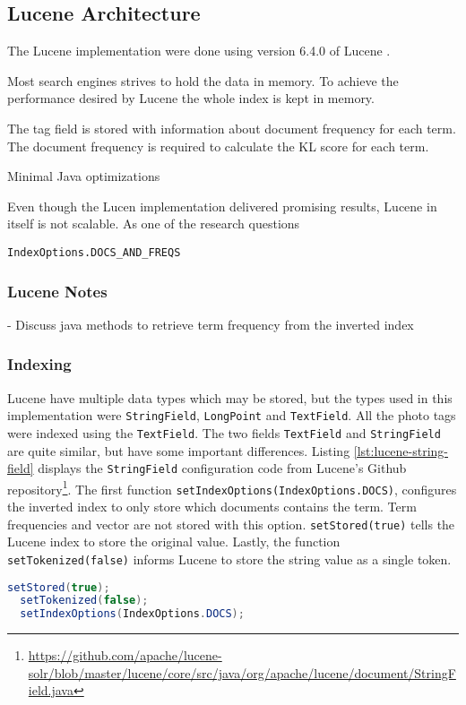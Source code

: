 \subsection{Lucene Architecture}
The Lucene implementation were done using version 6.4.0 of Lucene \cite{lucene-documentation}.

Most search engines strives to hold the data in memory.
To achieve the performance desired by Lucene the whole index is kept in memory.

The tag field is stored with information about document frequency for each term.
The document frequency is required to calculate the KL score for each term.

Minimal Java optimizations


Even though the Lucen implementation delivered promising results, Lucene in itself is not scalable.
As one of the research questions

\texttt{IndexOptions.DOCS\_AND\_FREQS}

\subsubsection{Lucene Notes}
- Discuss java methods to retrieve term frequency from the inverted index

\subsubsection{Indexing}
Lucene have multiple data types which may be stored,
but the types used in this implementation were \texttt{StringField}, \texttt{LongPoint} and \texttt{TextField}.
All the photo tags were indexed using the \texttt{TextField}.
The two fields \texttt{TextField} and \texttt{StringField} are quite similar,
but have some important differences.
Listing \ref{lst:lucene-string-field} displays the \texttt{StringField} configuration code from Lucene's Github repository\footnote{\url{https://github.com/apache/lucene-solr/blob/master/lucene/core/src/java/org/apache/lucene/document/StringField.java}}.
The first function \texttt{setIndexOptions(IndexOptions.DOCS)},
configures the inverted index to only store which documents contains the term.
Term frequencies and vector are not stored with this option.
\texttt{setStored(true)} tells the Lucene index to store the original value.
Lastly, the function \texttt{setTokenized(false)} informs Lucene to store the string value as a single token.

\begin{lstlisting}[language=java, caption={Lucene's \texttt{StringField} index configuration.}, label={lst:lucene-string-field}]
  setStored(true);
  setTokenized(false);
  setIndexOptions(IndexOptions.DOCS);
\end{lstlisting}

